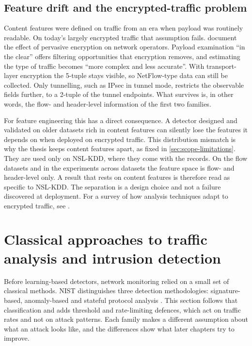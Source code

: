 \subsection{Feature drift and the encrypted-traffic problem}
\label{sec:feature-drift-encrypted-traffic}

Content features were defined on traffic from an era when payload was
routinely readable. On today's largely encrypted traffic that assumption
fails. \citet{moriarty2018rfc8404} document the effect of pervasive
encryption on network operators. Payload examination ``in the clear'' offers
filtering opportunities that encryption removes, and estimating the type of
traffic becomes ``more complex and less accurate''. With transport-layer
encryption the 5-tuple stays visible, so NetFlow-type data can still be
collected. Only tunnelling, such as IPsec in tunnel mode, restricts the
observable fields further, to a 2-tuple of the tunnel endpoints. What
survives is, in other words, the flow- and header-level information of the
first two families.

For feature engineering this has a direct consequence. A detector designed
and validated on older datasets rich in content features can silently lose
the features it depends on when deployed on encrypted traffic. This
distribution mismatch is why the thesis keeps content features apart, as
fixed in \cref{sec:scope-limitations}. They are used only on NSL-KDD, where
they come with the records. On the flow datasets and in the experiments
across datasets the feature space is flow- and header-level only. A result
that rests on content features is therefore read as specific to NSL-KDD. The
separation is a design choice and not a failure discovered at deployment. For a survey of how analysis
techniques adapt to encrypted traffic, see \citet{papadogiannaki2021encryptedsurvey}.

\section{Classical approaches to traffic analysis and intrusion detection}
\label{sec:classical-approaches}

Before learning-based detectors, network monitoring relied on a small set of
classical methods. NIST distinguishes three detection methodologies:
signature-based, anomaly-based and stateful protocol analysis
\citep{scarfone2007nist80094}. This section follows that classification and
adds threshold and rate-limiting defences, which act on traffic rates and not
on attack patterns. Each family makes a different assumption about what an
attack looks like, and the differences show what later chapters try to
improve.

